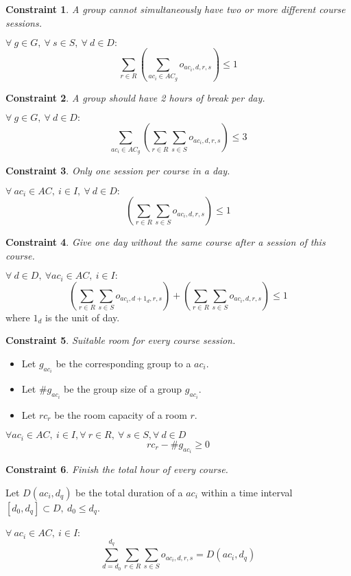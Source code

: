 \documentclass[12pt,a4paper]{article}
\newtheorem{theorem}{Constraint}
\begin{document}
\begin{theorem}
A group cannot simultaneously have two or more different course sessions.
\end{theorem}
$
\forall \ g \in G, \ \forall	\ s \in S, \ \forall \ d \in D :
$
\begin{equation}
\sum_{r\in R}\left(\sum_{ac_i \in AC_g}{o_{ac_{i}, d, r, s}}\right) \leq 1
\end{equation}
\begin{theorem}
A group should have 2 hours of break per day.
\end{theorem}
$
\forall \ g \in G, \ \forall \ d \in D :
$
\begin{equation}
\sum_{ac_{i} \in AC_{g}}\left(\sum_{r\in R}{\sum_{s \in S}{o_{ac_{i}, d, r, s}}}\right) \leq 3
\end{equation}
\begin{theorem}
Only one session per course in a day.
\end{theorem}
$
\forall \ ac_i \in AC,\ i \in I, \ \forall \ d \in D :
$
\begin{equation}
\left(\sum_{r\in R}{\sum_{s \in S}{o_{ac_{i}, d, r, s}}}\right) \leq 1
\end{equation}
\begin{theorem}
Give one day without the same course after a session of this course.
\end{theorem}
$
\forall \ d \in D, \ \forall ac_i \in AC, \ i \in I:
$
\begin{equation}
\left(\sum_{r\in R}{\sum_{s \in S}{o_{ac_{i}, d + 1_d, r, s}}}\right) + \left(\sum_{r\in R}{\sum_{s \in S}{o_{ac_{i}, d, r, s}}}\right) \leq 1
\end{equation}
where $1_d$ is the unit of day.

\begin{theorem}
Suitable room for every course session.
\end{theorem}

\begin{itemize}
	\item Let $g_{ac_{i}}$ be the corresponding group to a ${ac_{i}}$.
	\item Let $\#g_{ac_{i}}$ be the group size of a group $g_{ac_{i}}$.
	\item Let $rc_r$ be the room capacity of a room $r$.
\end{itemize}

$
\forall ac_i \in AC, \ i \in I, \forall \ r \in R, \ \forall \ s \in S, \forall \ d \in D 
$
\begin{equation}
rc_r - \#g_{ac_{i}} \geq 0
\end{equation}

\begin{theorem}
Finish the total hour of every course.
\end{theorem}
Let $D(ac_i, d_q)$ be the total duration of a $ac_i$ within a time interval $\left[d_0, d_q\right] \subset D, \ d_0 \leq d_q$. \\ \\
$
\forall \ ac_{i} \in AC, \ i \in I :
$ \\
\begin{equation}
\sum_{d = d_0 }^{d_q}\sum_{r \in R}\sum_{s \in S} {o_{ac_{i}, d, r, s}} = D(ac_{i}, d_q)
\end{equation}
\end{document}
